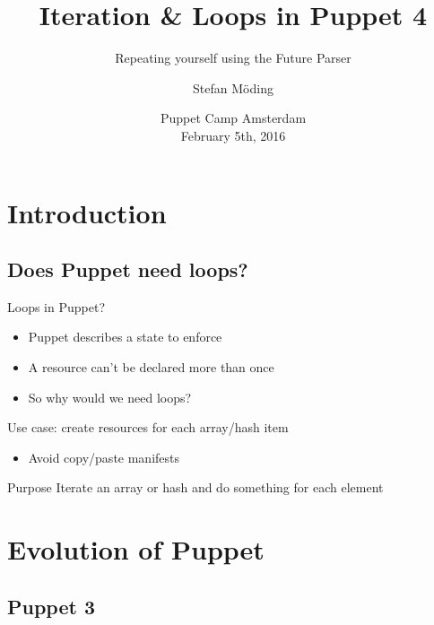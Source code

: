 \documentclass[english,aspectratio=43,nohandout]{beamer}
\title{Iteration \& Loops in Puppet 4}
\subtitle{Repeating yourself using the Future Parser}
\date{Puppet Camp Amsterdam\\February 5th, 2016}
\author{Stefan Möding}
\begin{document}
\begin{frame}
\titlepage
\end{frame}

\section{Introduction}
\subsection{Does Puppet need loops?}

\begin{frame}{\insertsection}{\insertsubsection}

Loops in Puppet?\pause
\begin{itemize}
\item Puppet describes a state to enforce
\item A resource can't be declared more than once
\item So why would we need loops?
\end{itemize}

\vspace{\baselineskip}\pause

Use case: create resources for each array/hash item
\begin{itemize}
\item Avoid copy/paste manifests
\end{itemize}

\vspace{\baselineskip}\pause

\begin{block}{Purpose}
Iterate an array or hash and do something for each element
\end{block}
\end{frame}

\section{Evolution of Puppet}
\subsection{Puppet 3}
\end{document}
